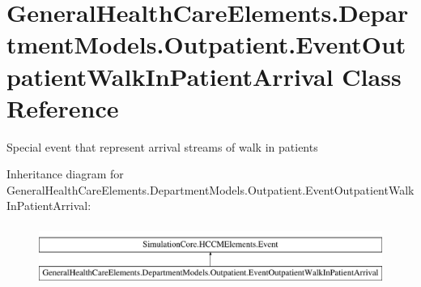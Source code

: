\hypertarget{class_general_health_care_elements_1_1_department_models_1_1_outpatient_1_1_event_outpatient_walk_in_patient_arrival}{}\section{General\+Health\+Care\+Elements.\+Department\+Models.\+Outpatient.\+Event\+Outpatient\+Walk\+In\+Patient\+Arrival Class Reference}
\label{class_general_health_care_elements_1_1_department_models_1_1_outpatient_1_1_event_outpatient_walk_in_patient_arrival}


Special event that represent arrival streams of walk in patients  


Inheritance diagram for General\+Health\+Care\+Elements.\+Department\+Models.\+Outpatient.\+Event\+Outpatient\+Walk\+In\+Patient\+Arrival\+:\begin{figure}[H]
\begin{center}
\leavevmode
\includegraphics[height=2.000000cm]{class_general_health_care_elements_1_1_department_models_1_1_outpatient_1_1_event_outpatient_walk_in_patient_arrival}
\end{center}
\end{figure}
